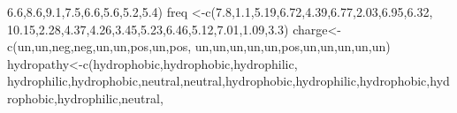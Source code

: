 \documentclass[
]{book}
\newenvironment{Shaded}{\begin{snugshade}}{\end{snugshade}}
\newcommand{\FloatTok}[1]{\textcolor[rgb]{0.00,0.00,0.81}{#1}}
\newcommand{\FunctionTok}[1]{\textcolor[rgb]{0.00,0.00,0.00}{#1}}
\newcommand{\NormalTok}[1]{#1}
\newcommand{\OtherTok}[1]{\textcolor[rgb]{0.56,0.35,0.01}{#1}}
\newcommand{\StringTok}[1]{\textcolor[rgb]{0.31,0.60,0.02}{#1}}
\begin{document}
\begin{Shaded}
\begin{Highlighting}[]
                 \FloatTok{6.6}\NormalTok{,}\FloatTok{8.6}\NormalTok{,}\FloatTok{9.1}\NormalTok{,}\FloatTok{7.5}\NormalTok{,}\FloatTok{6.6}\NormalTok{,}\FloatTok{5.6}\NormalTok{,}\FloatTok{5.2}\NormalTok{,}\FloatTok{5.4}\NormalTok{)}
\NormalTok{freq        }\OtherTok{\textless{}{-}}\FunctionTok{c}\NormalTok{(}\FloatTok{7.8}\NormalTok{,}\FloatTok{1.1}\NormalTok{,}\FloatTok{5.19}\NormalTok{,}\FloatTok{6.72}\NormalTok{,}\FloatTok{4.39}\NormalTok{,}\FloatTok{6.77}\NormalTok{,}\FloatTok{2.03}\NormalTok{,}\FloatTok{6.95}\NormalTok{,}\FloatTok{6.32}\NormalTok{,}
                \FloatTok{10.15}\NormalTok{,}\FloatTok{2.28}\NormalTok{,}\FloatTok{4.37}\NormalTok{,}\FloatTok{4.26}\NormalTok{,}\FloatTok{3.45}\NormalTok{,}\FloatTok{5.23}\NormalTok{,}\FloatTok{6.46}\NormalTok{,}\FloatTok{5.12}\NormalTok{,}\FloatTok{7.01}\NormalTok{,}\FloatTok{1.09}\NormalTok{,}\FloatTok{3.3}\NormalTok{)}
\NormalTok{charge}\OtherTok{\textless{}{-}}\FunctionTok{c}\NormalTok{(}\StringTok{\textquotesingle{}un\textquotesingle{}}\NormalTok{,}\StringTok{\textquotesingle{}un\textquotesingle{}}\NormalTok{,}\StringTok{\textquotesingle{}neg\textquotesingle{}}\NormalTok{,}\StringTok{\textquotesingle{}neg\textquotesingle{}}\NormalTok{,}\StringTok{\textquotesingle{}un\textquotesingle{}}\NormalTok{,}\StringTok{\textquotesingle{}un\textquotesingle{}}\NormalTok{,}\StringTok{\textquotesingle{}pos\textquotesingle{}}\NormalTok{,}\StringTok{\textquotesingle{}un\textquotesingle{}}\NormalTok{,}\StringTok{\textquotesingle{}pos\textquotesingle{}}\NormalTok{,}
          \StringTok{\textquotesingle{}un\textquotesingle{}}\NormalTok{,}\StringTok{\textquotesingle{}un\textquotesingle{}}\NormalTok{,}\StringTok{\textquotesingle{}un\textquotesingle{}}\NormalTok{,}\StringTok{\textquotesingle{}un\textquotesingle{}}\NormalTok{,}\StringTok{\textquotesingle{}un\textquotesingle{}}\NormalTok{,}\StringTok{\textquotesingle{}pos\textquotesingle{}}\NormalTok{,}\StringTok{\textquotesingle{}un\textquotesingle{}}\NormalTok{,}\StringTok{\textquotesingle{}un\textquotesingle{}}\NormalTok{,}\StringTok{\textquotesingle{}un\textquotesingle{}}\NormalTok{,}\StringTok{\textquotesingle{}un\textquotesingle{}}\NormalTok{,}\StringTok{\textquotesingle{}un\textquotesingle{}}\NormalTok{)}
\NormalTok{hydropathy}\OtherTok{\textless{}{-}}\FunctionTok{c}\NormalTok{(}\StringTok{\textquotesingle{}hydrophobic\textquotesingle{}}\NormalTok{,}\StringTok{\textquotesingle{}hydrophobic\textquotesingle{}}\NormalTok{,}\StringTok{\textquotesingle{}hydrophilic\textquotesingle{}}\NormalTok{,}\StringTok{\textquotesingle{}}
\StringTok{              hydrophilic\textquotesingle{}}\NormalTok{,}\StringTok{\textquotesingle{}hydrophobic\textquotesingle{}}\NormalTok{,}\StringTok{\textquotesingle{}neutral\textquotesingle{}}\NormalTok{,}\StringTok{\textquotesingle{}neutral\textquotesingle{}}\NormalTok{,}\StringTok{\textquotesingle{}hydrophobic\textquotesingle{}}\NormalTok{,}\StringTok{\textquotesingle{}hydrophilic\textquotesingle{}}\NormalTok{,}\StringTok{\textquotesingle{}hydrophobic\textquotesingle{}}\NormalTok{,}\StringTok{\textquotesingle{}hydrophobic\textquotesingle{}}\NormalTok{,}\StringTok{\textquotesingle{}hydrophilic\textquotesingle{}}\NormalTok{,}\StringTok{\textquotesingle{}neutral\textquotesingle{}}\NormalTok{,}

\end{Highlighting}
\end{Shaded}
\end{document}
